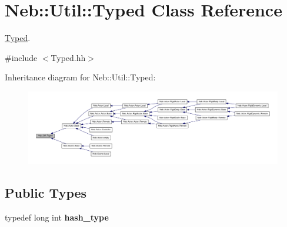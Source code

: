 \hypertarget{classNeb_1_1Util_1_1Typed}{\section{\-Neb\-:\-:\-Util\-:\-:\-Typed \-Class \-Reference}
\label{classNeb_1_1Util_1_1Typed}
}


\hyperlink{classNeb_1_1Util_1_1Typed}{\-Typed}.  




{\ttfamily \#include $<$\-Typed.\-hh$>$}



\-Inheritance diagram for \-Neb\-:\-:\-Util\-:\-:\-Typed\-:\nopagebreak
\begin{figure}[H]
\begin{center}
\leavevmode
\includegraphics[width=350pt]{classNeb_1_1Util_1_1Typed__inherit__graph}
\end{center}
\end{figure}
\subsection*{\-Public \-Types}
\begin{DoxyCompactItemize}
\item 
\hypertarget{classNeb_1_1Util_1_1Typed_a9231f5f2a637c7bd3c0f310d32dc2f1f}{typedef long int {\bfseries hash\-\_\-type}}\label{classNeb_1_1Util_1_1Typed_a9231f5f2a637c7bd3c0f310d32dc2f1f}

\end{DoxyCompactItemize}

